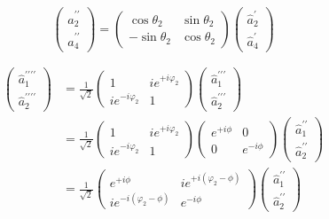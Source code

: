 \begin{equation}
	\begin{pmatrix}
		\hat{a}_2^{\prime\prime} \\
		\hat{a}_4^{\prime\prime}
	\end{pmatrix}
	=
	\begin{pmatrix}
		 \cos\theta_2 & \sin\theta_2 \\
		 -\sin\theta_2 & \cos\theta_2
	\end{pmatrix}
	\begin{pmatrix}
		\hat{a}_2^\prime \\
		\hat{a}_4^\prime
	\end{pmatrix}
\end{equation}


\begin{equation}
	\begin{split}
		\begin{pmatrix}
			\hat{a}_1^{\prime\prime\prime\prime} \\
			\hat{a}_2^{\prime\prime\prime\prime}
		\end{pmatrix}
		&=
		\frac{1}{\sqrt{2}}
		\begin{pmatrix}
			1 & ie^{+i\varphi_2} \\
			ie^{-i\varphi_2} & 1
		\end{pmatrix}
		\begin{pmatrix}
			\hat{a}_1^{\prime\prime\prime} \\
			\hat{a}_2^{\prime\prime\prime}
		\end{pmatrix}
		\\
		&=
		\frac{1}{\sqrt{2}}
		\begin{pmatrix}
			1 & ie^{+i\varphi_2} \\
			ie^{-i\varphi_2} & 1
		\end{pmatrix}
		\begin{pmatrix}
			e^{+i\phi} & 0 \\
			0 & e^{-i\phi}
		\end{pmatrix}
		\begin{pmatrix}
			\hat{a}_1^{\prime\prime} \\
			\hat{a}_2^{\prime\prime}
		\end{pmatrix}
		\\
		&=
		\frac{1}{\sqrt{2}}
		\begin{pmatrix}
			e^{+i\phi} & ie^{+i(\varphi_2-\phi)} \\
			ie^{-i(\varphi_2-\phi)} & e^{-i\phi}
		\end{pmatrix}
		\begin{pmatrix}
			\hat{a}_1^{\prime\prime} \\
			\hat{a}_2^{\prime\prime}
		\end{pmatrix}
	\end{split}
\end{equation}